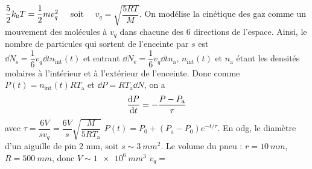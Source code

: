 \begin{solution}
\begin{questions}
    \questioncours $\dfrac{5}{2}k_\textsc{b}T = \dfrac{1}{2}mv_q^2\quad$ soit $\quad v_q = \sqrt{\dfrac{5RT}{M}}$.
    \question On modélise la cinétique des gaz comme un mouvement des molécules à $v_q$ dans chacune des 6 directions de l'espace.
    Ainsi, le nombre de particules qui sortent de l'enceinte par $s$ est \\
    $\dd{N}_\text{s} = \dfrac{1}{6}v_q\dd{t} n_\text{int}(t)$ et entrant $\dd{N}_\text{e} = \dfrac{1}{6}v_q\dd{t} n_\text{a}$, $n_\text{int}(t)$ et $n_\text{a}$ étant les densités molaires à l'intérieur et à l'extérieur de l'enceinte.
    \question Donc comme $P(t) = n_\text{int}(t)RT_\text{a}$ et $\dd{P} = RT_\text{a}\dd{N}$, on a 
    $$\dv{P}{t} = - \dfrac{P - P_\text{a}}{\tau}$$
    avec $\tau = \dfrac{6V}{s v_q} = \dfrac{6V}{s}\sqrt{\dfrac{M}{5RT_\text{a}}}$
    \question $P(t) = P_0 + (P_\text{a} - P_0)e^{-t/\tau}$.
    En odg, le diamètre d'un aiguille de pin 2 mm, soit $s \sim \SI{3}{mm^2}$.
    Le volume du pneu : $r = \SI{10}{mm}$, $R=\SI{500}{mm}$, donc $V \sim \SI{1e6}{mm^3}$
    $v_q = $
\end{questions}
\end{solution}